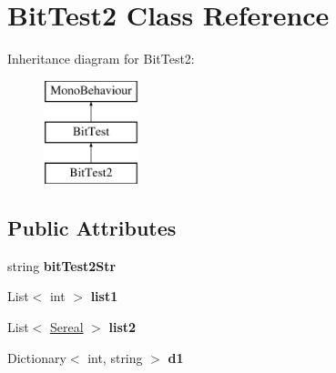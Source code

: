 \hypertarget{class_bit_test2}{\section{Bit\-Test2 Class Reference}
\label{class_bit_test2}
}
Inheritance diagram for Bit\-Test2\-:\begin{figure}[H]
\begin{center}
\leavevmode
\includegraphics[height=3.000000cm]{class_bit_test2}
\end{center}
\end{figure}
\subsection*{Public Attributes}
\begin{DoxyCompactItemize}
\item 
\hypertarget{class_bit_test2_adb24602605c8f93489e0a78c52fc11c6}{string {\bfseries bit\-Test2\-Str}}\label{class_bit_test2_adb24602605c8f93489e0a78c52fc11c6}

\item 
\hypertarget{class_bit_test2_a165f84e9745d95c264b07ba5b3547161}{List$<$ int $>$ {\bfseries list1}}\label{class_bit_test2_a165f84e9745d95c264b07ba5b3547161}

\item 
\hypertarget{class_bit_test2_ace61bc6d3735c8e66d31125f1e3faa35}{List$<$ \hyperlink{class_bit_test_1_1_sereal}{Sereal} $>$ {\bfseries list2}}\label{class_bit_test2_ace61bc6d3735c8e66d31125f1e3faa35}

\item 
\hypertarget{class_bit_test2_ab4bf90367ffd77c563ab2416f3f7bdd8}{Dictionary$<$ int, string $>$ {\bfseries d1}}\label{class_bit_test2_ab4bf90367ffd77c563ab2416f3f7bdd8}

\end{DoxyCompactItemize}

